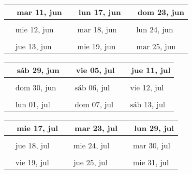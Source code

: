 \documentclass[letterpaper,10pt]{article}
\begin{document}
\begin{tabular}{lll}
\\
{\ \ mar 11, jun\hspace{4.5cm}\vspace{2.25cm}} &{\ \ lun 17, jun\hspace{4.5cm}} &{\ \ dom 23, jun\hspace{4.5cm}}
\\ \hline \\
{\ \ mie 12, jun\vspace{2.25cm}} & {\ \ mar 18, jun} & {\ \ lun 24, jun}
\\ \hline \\
{\ \ jue 13, jun\vspace{2.25cm}} & {\ \ mie 19, jun} & {\ \ mar 25, jun}
\\
\end{tabular}\par
\begin{tabular}{lll}
\\
{\ \ sáb 29, jun\hspace{4.5cm}\vspace{2.25cm}} &{\ \ vie 05, jul\hspace{4.5cm}} &{\ \ jue 11, jul\hspace{4.5cm}}
\\ \hline \\
{\ \ dom 30, jun\vspace{2.25cm}} & {\ \ sáb 06, jul} & {\ \ vie 12, jul}
\\ \hline \\
{\ \ lun 01, jul\vspace{2.25cm}} & {\ \ dom 07, jul} & {\ \ sáb 13, jul}
\\
\end{tabular}\par
\begin{tabular}{lll}
\\
{\ \ mie 17, jul\hspace{4.5cm}\vspace{2.25cm}} &{\ \ mar 23, jul\hspace{4.5cm}} &{\ \ lun 29, jul\hspace{4.5cm}}
\\ \hline \\
{\ \ jue 18, jul\vspace{2.25cm}} & {\ \ mie 24, jul} & {\ \ mar 30, jul}
\\ \hline \\
{\ \ vie 19, jul\vspace{2.25cm}} & {\ \ jue 25, jul} & {\ \ mie 31, jul}
\\
\end{tabular}\par
\end{document}
